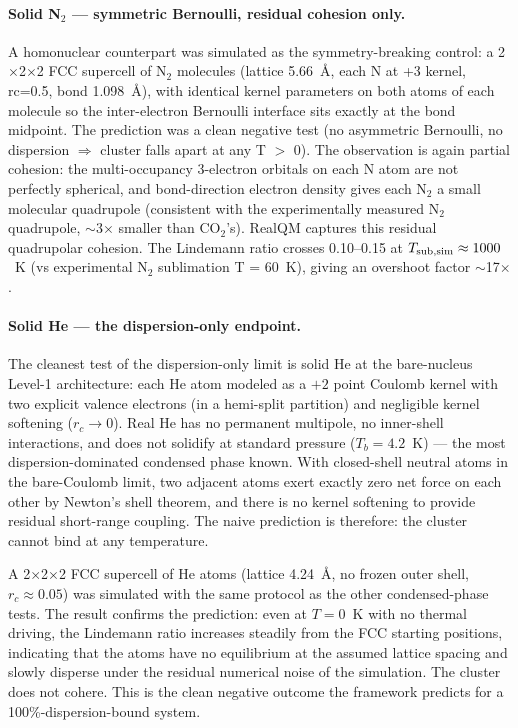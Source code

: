 \documentclass[11pt]{article}
\begin{document}
\paragraph{Solid N$_2$ --- symmetric Bernoulli, residual cohesion only.}
A homonuclear counterpart was simulated as the symmetry-breaking control: a 2$\times$2$\times$2 FCC supercell of N$_2$ molecules (lattice 5.66~\AA, each N at +3 kernel, rc=0.5, bond 1.098~\AA), with identical kernel parameters on both atoms of each molecule so the inter-electron Bernoulli interface sits exactly at the bond midpoint. The prediction was a clean negative test (no asymmetric Bernoulli, no dispersion $\Rightarrow$ cluster falls apart at any T $>$ 0). The observation is again partial cohesion: the multi-occupancy 3-electron orbitals on each N atom are not perfectly spherical, and bond-direction electron density gives each N$_2$ a small molecular quadrupole (consistent with the experimentally measured N$_2$ quadrupole, $\sim$3$\times$ smaller than CO$_2$'s). RealQM captures this residual quadrupolar cohesion. The Lindemann ratio crosses 0.10--0.15 at $T_{\rm sub,sim} \approx 1000$~K (vs experimental N$_2$ sublimation T = 60~K), giving an overshoot factor $\sim$17$\times$.

\paragraph{Solid He --- the dispersion-only endpoint.}
The cleanest test of the dispersion-only limit is solid He at the bare-nucleus Level-1 architecture: each He atom modeled as a $+2$ point Coulomb kernel with two explicit valence electrons (in a hemi-split partition) and negligible kernel softening ($r_c \to 0$). Real He has no permanent multipole, no inner-shell interactions, and does not solidify at standard pressure ($T_b = 4.2$~K) --- the most dispersion-dominated condensed phase known. With closed-shell neutral atoms in the bare-Coulomb limit, two adjacent atoms exert exactly zero net force on each other by Newton's shell theorem, and there is no kernel softening to provide residual short-range coupling. The naive prediction is therefore: the cluster cannot bind at any temperature.

A 2$\times$2$\times$2 FCC supercell of He atoms (lattice 4.24~\AA, no frozen outer shell, $r_c \approx 0.05$) was simulated with the same protocol as the other condensed-phase tests. The result confirms the prediction: even at $T = 0$~K with no thermal driving, the Lindemann ratio increases steadily from the FCC starting positions, indicating that the atoms have no equilibrium at the assumed lattice spacing and slowly disperse under the residual numerical noise of the simulation. The cluster does not cohere. This is the clean negative outcome the framework predicts for a 100\%-dispersion-bound system.
\end{document}
